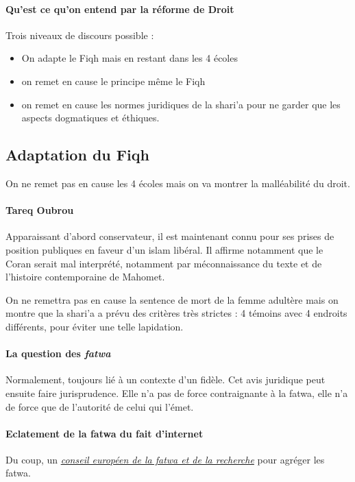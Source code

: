     \paragraph{Qu'est ce qu'on entend par la réforme de Droit} Trois niveaux de discours possible : 
    \begin{itemize}
        \item On adapte le Fiqh mais en restant dans les 4 écoles
        \item on remet en cause le principe même le Fiqh
        \item on remet en cause les normes juridiques de la shari'a pour ne garder que les aspects dogmatiques et éthiques.
    \end{itemize}
    
    \subsection{Adaptation du Fiqh}
    On ne remet pas en cause les 4 écoles mais on va montrer la malléabilité du droit.
    \paragraph{Tareq Oubrou} Apparaissant d'abord conservateur, il est maintenant connu pour ses prises de position publiques en faveur d'un islam libéral. Il affirme notamment que le Coran serait mal interprété, notamment par méconnaissance du texte et de l'histoire contemporaine de Mahomet.  \label{Theo:TareqOubrou} \pageref{tareq-oubrou}  
    \begin{Ex}
    On ne remettra pas en cause la sentence de mort de la femme adultère mais on montre que la shari'a a prévu des critères très strictes : 4 témoins avec 4 endroits différents, pour éviter une telle lapidation.
    \end{Ex}
    
    \paragraph{La question des \emph{fatwa}} Normalement, toujours lié à un contexte d'un fidèle. Cet avis juridique peut ensuite faire jurisprudence. Elle n'a pas de force contraignante à la fatwa, elle n'a de force que de l'autorité de celui qui l'émet.
    
    \paragraph{Eclatement de la fatwa du fait d'internet} 
    Du coup, un \href{https://fr.wikipedia.org/wiki/Conseil_europ\%C3\%A9en_pour_la_fatwa_et_la_recherche}{\textit{conseil européen de la fatwa et de la recherche}}  pour agréger les fatwa.
    
